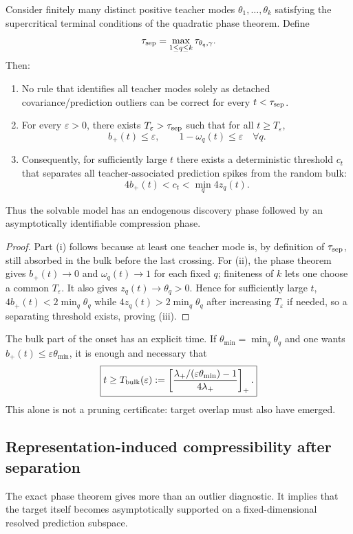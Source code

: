 \begin{theorem}\label{thm:bbp-onset}
Consider finitely many distinct positive teacher modes $\theta_1,\ldots,\theta_k$ satisfying the supercritical terminal conditions of the quadratic phase theorem. Define
\[
\tau_{\rm sep}=\max_{1\le q\le k}\tau_{\theta_q,\gamma}.
\]
Then:
\begin{enumerate}[label=(\roman*)]
\item No rule that identifies all teacher modes solely as detached covariance/prediction outliers can be correct for every $t<\tau_{\rm sep}$.
\item For every $\varepsilon>0$, there exists $T_\varepsilon>\tau_{\rm sep}$ such that for all $t\ge T_\varepsilon$,
\[
b_+(t)\le\varepsilon,
\qquad
1-\omega_q(t)\le\varepsilon\quad\forall q.
\]
\item Consequently, for sufficiently large $t$ there exists a deterministic threshold $c_t$ that separates all teacher-associated prediction spikes from the random bulk:
\[
4b_+(t)<c_t<\min_q4z_q(t).
\]
\end{enumerate}
Thus the solvable model has an endogenous discovery phase followed by an asymptotically identifiable compression phase.
\end{theorem}

\begin{proof}
Part (i) follows because at least one teacher mode is, by definition of $\tau_{\rm sep}$, still absorbed in the bulk before the last crossing. For (ii), the phase theorem gives $b_+(t)\to0$ and $\omega_q(t)\to1$ for each fixed $q$; finiteness of $k$ lets one choose a common $T_\varepsilon$. It also gives $z_q(t)\to\theta_q>0$. Hence for sufficiently large $t$, $4b_+(t)<2\min_q\theta_q$ while $4z_q(t)>2\min_q\theta_q$ after increasing $T_\varepsilon$ if needed, so a separating threshold exists, proving (iii).
\end{proof}

The bulk part of the onset has an explicit time. If $\theta_{\min}=\min_q\theta_q$ and one wants
$b_+(t)\le\varepsilon\theta_{\min}$, it is enough and necessary that
\[
\boxed{
t\ge
T_{\rm bulk}(\varepsilon)
:=
\left[
\frac{\lambda_+/(\varepsilon\theta_{\min})-1}{4\lambda_+}
\right]_+.
}
\]
This alone is not a pruning certificate: target overlap must also have emerged.

\subsection{Representation-induced compressibility after separation}
The exact phase theorem gives more than an outlier diagnostic. It implies that the target itself becomes asymptotically supported on a fixed-dimensional resolved prediction subspace.

